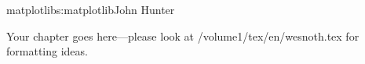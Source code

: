 \begin{aosachapter}{matplotlib}{s:matplotlib}{John Hunter}

Your chapter goes here---please look at /volume1/tex/en/wesnoth.tex for 
formatting ideas.

\end{aosachapter}

